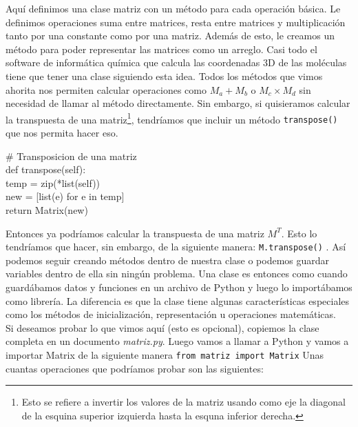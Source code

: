 \documentclass[10pt,letterpaper]{article}
\newcommand{\inlinecode}[1]{
\colorbox{light-gray}{\texttt{#1}}
}
\newenvironment{Code}
{
\begin{lrbox}{\selvestebox}%
\begin{minipage}{\dimexpr\columnwidth-2\fboxsep\relax}
\fontfamily{\ttdefault}\selectfont
}
{\end{minipage}\end{lrbox}%
\begin{center}
\colorbox{light-gray}{\usebox{\selvestebox}}
\end{center}
}
\begin{document}
Aqu\'i definimos una clase matriz con un m\'etodo para cada operaci\'on b\'asica. Le definimos operaciones suma entre matrices, resta entre matrices y multiplicaci\'on tanto por una constante como por una matriz. Adem\'as de esto, le creamos un m\'etodo para poder representar las matrices como un arreglo. Casi todo el software de inform\'atica qu\'imica que calcula las coordenadas 3D de las mol\'eculas tiene que tener una clase siguiendo esta idea. Todos los m\'etodos que vimos ahorita nos permiten calcular operaciones como $M_a + M_b$ o $M_c \times M_d$ sin necesidad de llamar al m\'etodo directamente. Sin embargo, si quisieramos calcular la transpuesta de una matriz\footnote{Esto se refiere a invertir los valores de la matriz usando como eje la diagonal de la esquina superior izquierda hasta la esquna inferior derecha.}, tendr\'iamos que incluir un m\'etodo \inlinecode{transpose()} que nos permita hacer eso.

\begin{footnotesize}
\begin{Code}
\# Transposicion de una matriz\\
def transpose(self):\\
\hspace*{5mm} temp = zip(*list(self))\\
\hspace*{5mm} new = [list(e) for e in temp]\\
\hspace*{5mm} return Matrix(new)
\end{Code}
\end{footnotesize}

Entonces ya podr\'iamos calcular la transpuesta de una matriz $M^T$. Esto lo tendr\'iamos que hacer, sin embargo, de la siguiente manera: \inlinecode{M.transpose()}. As\'i podemos seguir creando m\'etodos dentro de nuestra clase o podemos guardar variables dentro de ella sin ning\'un problema. Una clase es entonces como cuando guard\'abamos datos y funciones en un archivo de Python y luego lo import\'abamos como librer\'ia. La diferencia es que la clase tiene algunas caracter\'isticas especiales como los m\'etodos de inicializaci\'on, representaci\'on u operaciones matem\'aticas.\\

Si deseamos probar lo que vimos aqu\'i (esto es opcional), copiemos la clase completa en un documento \emph{matriz.py}. Luego vamos a llamar a Python y vamos a importar Matrix de la siguiente manera \inlinecode{from matriz import Matrix} Unas cuantas operaciones que podr\'iamos probar son las siguientes:
\end{document}
